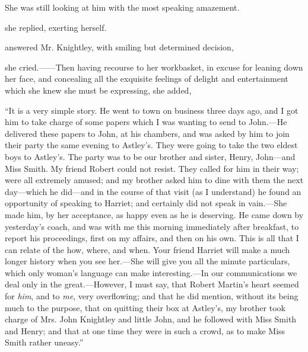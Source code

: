 She was still looking at him with the most speaking amazement.


 she replied, exerting herself. 

 answered Mr. Knightley, with smiling but determined decision, 

 she cried.------Then having recourse to her workbasket, in excuse for leaning down her face, and concealing all the exquisite feelings of delight and entertainment which she knew she must be expressing, she added, 

“It is a very simple story. He went to town on business three days ago, and I got him to take charge of some papers which I was wanting to send to John.---He delivered these papers to John, at his chambers, and was asked by him to join their party the same evening to Astley's. They were going to take the two eldest boys to Astley's. The party was to be our brother and sister, Henry, John---and Miss Smith. My friend Robert could not resist. They called for him in their way; were all extremely amused; and my brother asked him to dine with them the next day---which he did---and in the course of that visit (as I understand) he found an opportunity of speaking to Harriet; and certainly did not speak in vain.---She made him, by her acceptance, as happy even as he is deserving. He came down by yesterday's coach, and was with me this morning immediately after breakfast, to report his proceedings, first on my affairs, and then on his own. This is all that I can relate of the how, where, and when. Your friend Harriet will make a much longer history when you see her.---She will give you all the minute particulars, which only woman's language can make interesting.---In our communications we deal only in the great.---However, I must say, that Robert Martin's heart seemed for {\em him}, and to {\em me}, very overflowing; and that he did mention, without its being much to the purpose, that on quitting their box at Astley's, my brother took charge of Mrs. John Knightley and little John, and he followed with Miss Smith and Henry; and that at one time they were in such a crowd, as to make Miss Smith rather uneasy.”

